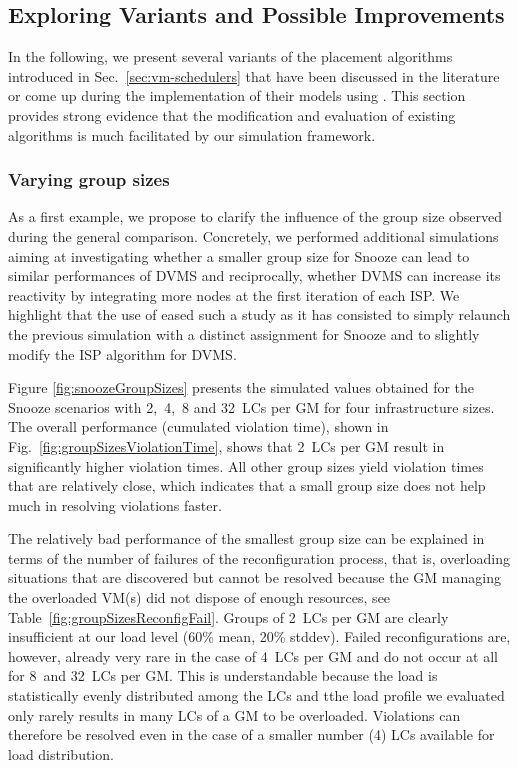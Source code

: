 \subsection{Exploring Variants and Possible Improvements}
\label{subsec:variant}

In the following, we present several variants of
the placement algorithms introduced in Sec.~\ref{sec:vm-schedulers}
that have been discussed in the literature or come up during the
implementation of their models using \vmps. This section provides
strong evidence that the modification and evaluation of existing
algorithms is much facilitated by our simulation framework.

\subsubsection{Varying group sizes}

As a first example, we propose to clarify the influence of the group
size observed during the general comparison.
Concretely, we performed additional simulations aiming at
investigating whether a smaller group size for Snooze can lead to similar
performances of DVMS and reciprocally, whether DVMS can increase its
reactivity by integrating more nodes at the first iteration of each
ISP. We highlight that the use of \vmps eased such a study as it has consisted
to simply relaunch the previous simulation with a distinct
assignment for Snooze and to slightly modify the ISP algorithm for DVMS.


Figure \ref{fig:snoozeGroupSizes} presents the simulated values
obtained for the Snooze scenarios with 2,~4,~8 and 32~LCs per GM for four
infrastructure sizes. The overall performance (\ie cumulated violation
time), shown in Fig.~\ref{fig:groupSizesViolationTime}, shows that
2~LCs per GM result in significantly higher violation times. All other
group sizes yield violation times that are relatively close, which
indicates that a small group size does not help much in
resolving violations faster.

The relatively bad performance of the smallest group size can be
explained in terms of the number of failures of the reconfiguration
process, that is, overloading situations that are discovered but
cannot be resolved because the GM managing the overloaded VM(s) did
not dispose of enough resources, see
Table~\ref{fig:groupSizesReconfigFail}. Groups of 2~LCs per GM are
clearly insufficient at our load level (60\% mean, 20\% stddev).
Failed reconfigurations are, however, already very rare in the case of
4~LCs per GM and do not occur at all for 8~and 32~LCs per GM. This is
understandable because the load is statistically evenly distributed
among the LCs and tthe load profile we evaluated only rarely results
in many LCs of a GM to be overloaded. Violations can therefore be
resolved even in the case of a smaller number (4) LCs available for
load distribution.

